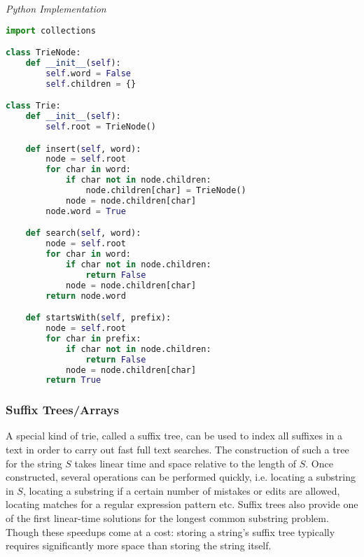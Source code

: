 \documentclass{article}
\begin{document}
\vspace{8pt} \emph{Python Implementation}
\begin{lstlisting}[language=Python]
import collections

class TrieNode:
    def __init__(self):
        self.word = False
        self.children = {}

class Trie:
    def __init__(self):
        self.root = TrieNode()

    def insert(self, word):
        node = self.root
        for char in word:
            if char not in node.children:
                node.children[char] = TrieNode()
            node = node.children[char]
        node.word = True

    def search(self, word):
        node = self.root
        for char in word:
            if char not in node.children:
                return False
            node = node.children[char]
        return node.word

    def startsWith(self, prefix):
        node = self.root
        for char in prefix:
            if char not in node.children:
                return False
            node = node.children[char]
        return True
\end{lstlisting}

    \subsubsection{Suffix Trees/Arrays}
    A special kind of trie, called a suffix tree, can be used to index all suffixes in a text in order to carry out fast full text searches. The construction of such a tree for the string $S$ takes linear time and space relative to the length of $S$. Once constructed, several operations can be performed quickly, i.e. locating a substring in $S$, locating a substring if a certain number of mistakes or edits are allowed, locating matches for a regular expression pattern etc. Suffix trees also provide one of the first linear-time solutions for the longest common substring problem. Though these speedups come at a cost: storing a string's suffix tree typically requires significantly more space than storing the string itself.
    
\end{document}
